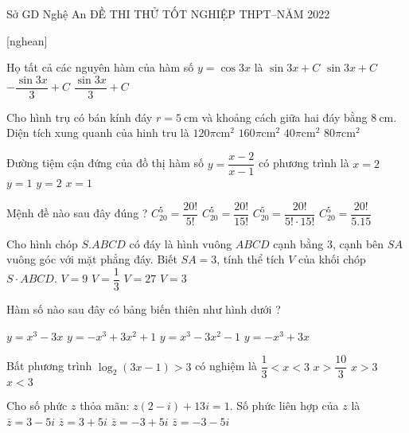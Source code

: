 \begin{name}
{Sở GD Nghệ An}
{ĐỀ THI THỬ TỐT NGHIỆP THPT--NĂM 2022 }
\end{name}
[nghean]
\begin{ex}
 Họ tất cả các nguyên hàm của hàm số $y=\cos 3 x$ là
\choice
{$\sin 3 x+C$}
{$\sin 3 x+C$}
{$-\dfrac{\sin 3 x}{3}+C$}
{$\dfrac{\sin 3 x}{3}+C$}
\end{ex}

\begin{ex}
 Cho hình trụ có bán kính đáy $r=5 \mathrm{~cm}$ và khoảng cách giữa hai đáy bằng $8 \mathrm{~cm}$. Diện tích xung quanh của hinh tru là
\choice
{$120 \pi \mathrm{cm}^{2}$}
{$160 \pi \mathrm{cm}^{2}$}
{$40 \pi \mathrm{cm}^{2}$}
{$80 \pi \mathrm{cm}^{2}$}
\end{ex}

\begin{ex}
 Đường tiệm cận đứng của đồ thị hàm số $y=\dfrac{x-2}{x-1}$ có phương trình là
\choice
{$x=2$}
{$y=1$}
{$y=2$}
{$x=1$}
\end{ex}

\begin{ex}
 Mệnh đề nào sau đây đúng ?
\choice
{$C_{20}^{5}=\dfrac{20 \text {!}}{5 !}$}
{$C_{20}^{5}=\dfrac{20 !}{15 !}$}
{$C_{20}^{5}=\dfrac{20 !}{5 ! \cdot 15 !}$}
{$C_{20}^{5}=\dfrac{20 !}{5.15}$}
\end{ex}

\begin{ex}
 Cho hình chóp $S. A B C D$ có đáy là hình vuông $A B C D$ cạnh bằng 3, cạnh bên $S A$ vuông góc với mặt phẳng đáy. Biết $S A=3$, tính thể tích $V$ của khối chóp $S \cdot A B C D$.
\choice
{$V=9$}
{$V=\dfrac{1}{3}$}
{$V=27$}
{$V=3$}
\end{ex}

\begin{ex}
 Hàm số nào sau đây có bảng biến thiên như hình dưới ?

\choice
{$y=x^{3}-3 x$}
{$y=-x^{3}+3 x^{2}+1$}
{$y=x^{3}-3 x^{2}-1$}
{$y=-x^{3}+3 x$}
\end{ex}

\begin{ex}
 Bất phương trình $\log _{2}(3 x-1)>3$ có nghiệm là
\choice
{$\dfrac{1}{3}<x<3$}
{$x>\dfrac{10}{3}$}
{$x>3$}
{$x<3$}
\end{ex}

\begin{ex}
 Cho số phức $z$ thỏa mãn: $z(2-i)+13 i=1$. Số phức liên hợp của $z$ là
\choice
{$\bar{z}=3-5 i$}
{$\bar{z}=3+5 i$}
{$\bar{z}=-3+5 i$}
{$\bar{z}=-3-5 i$}
\end{ex}

